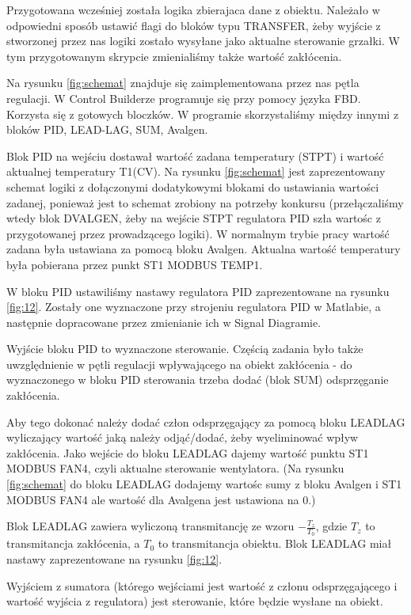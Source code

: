 \documentclass[12pt, a4paper]{article}
\begin{document}
Przygotowana wcześniej została logika zbierajaca dane z obiektu. Należało w odpowiedni sposób ustawić flagi do bloków typu TRANSFER, żeby wyjście z stworzonej przez nas logiki zostało wysyłane jako aktualne sterowanie grzałki. W tym przygotowanym skrypcie zmienialiśmy także wartość zakłócenia.

Na rysunku \ref{fig:schemat} znajduje się zaimplementowana przez nas pętla regulacji. W Control Builderze programuje się przy pomocy języka FBD. Korzysta się z gotowych bloczków. W programie skorzystaliśmy między innymi z bloków PID, LEAD-LAG, SUM, Avalgen.

Blok PID na wejściu dostawał wartość zadana temperatury (STPT) i wartość aktualnej temperatury T1(CV).  Na rysunku \ref{fig:schemat} jest zaprezentowany schemat logiki z dołączonymi dodatykowymi blokami do ustawiania wartości zadanej, ponieważ jest to schemat zrobiony na potrzeby konkursu (przełączaliśmy wtedy blok DVALGEN, żeby na wejście STPT regulatora PID szła wartośc z przygotowanej przez prowadzącego logiki). W normalnym trybie pracy wartość zadana była ustawiana za pomocą bloku Avalgen.
Aktualna wartość temperatury była pobierana przez punkt ST1 MODBUS TEMP1.

W bloku PID ustawiliśmy nastawy regulatora PID zaprezentowane na rysunku  \ref{fig:12}. Zostały one wyznaczone przy strojeniu regulatora PID w Matlabie, a następnie dopracowane przez zmienianie ich w Signal Diagramie.

Wyjście bloku PID to wyznaczone sterowanie. Częścią zadania było także uwzględnienie w pętli regulacji wpływającego na obiekt   zakłócenia - do wyznaczonego w bloku PID sterowania trzeba dodać (blok SUM) odsprzęganie zakłócenia.

Aby tego dokonać należy dodać człon odsprzęgający za pomocą bloku LEADLAG wyliczający wartość jaką należy odjąć/dodać, żeby wyeliminować wpływ zakłócenia. Jako wejście do bloku LEADLAG dajemy wartość punktu ST1 MODBUS FAN4, czyli aktualne sterowanie wentylatora. (Na rysunku \ref{fig:schemat} do bloku LEADLAG dodajemy wartośc sumy z bloku Avalgen i ST1 MODBUS FAN4 ale wartość dla Avalgena jest ustawiona na 0.) 

Blok LEADLAG zawiera wyliczoną transmitancję ze wzoru $-\frac{T_z}{T_0}$, gdzie $T_z$ to transmitancja zakłócenia, a $T_0$ to transmitancja obiektu. Blok LEADLAG miał nastawy zaprezentowane na rysunku \ref{fig:12}.

Wyjściem z sumatora (którego wejściami jest wartość z członu odsprzęgającego i wartość wyjścia z regulatora) jest sterowanie, które będzie wysłane na obiekt.
\end{document}
